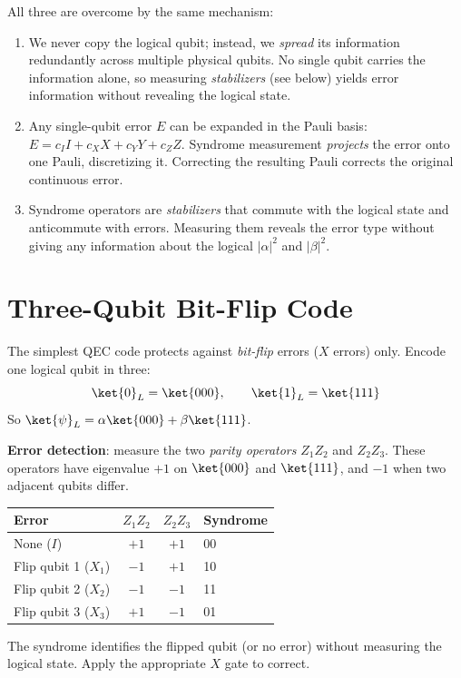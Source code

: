 \documentclass[oneside]{academica}
\begin{document}
All three are overcome by the same mechanism:
\begin{enumerate}
  \item We never copy the logical qubit; instead, we \emph{spread} its information redundantly across multiple physical qubits.
    No single qubit carries the information alone, so measuring \emph{stabilizers} (see below) yields error information without revealing the logical state.
  \item Any single-qubit error $E$ can be expanded in the Pauli basis: $E=c_I I+c_X X+c_Y Y+c_Z Z$.
    Syndrome measurement \emph{projects} the error onto one Pauli, discretizing it.
    Correcting the resulting Pauli corrects the original continuous error.
  \item Syndrome operators are \emph{stabilizers} that commute with the logical state and anticommute with errors.
    Measuring them reveals the error type without giving any information about the logical $|\alpha|^2$ and $|\beta|^2$.
\end{enumerate}

\section{Three-Qubit Bit-Flip Code}

The simplest QEC code protects against \emph{bit-flip} errors ($X$ errors) only.
Encode one logical qubit in three:
\begin{equation*}
  \ket{0}_L=\ket{000},\qquad\ket{1}_L=\ket{111}
\end{equation*}
So $\ket{\psi}_L=\alpha\ket{000}+\beta\ket{111}$.

\textbf{Error detection}: measure the two \emph{parity operators} $Z_1Z_2$ and $Z_2Z_3$.
These operators have eigenvalue $+1$ on $\ket{000}$ and $\ket{111}$, and $-1$ when two adjacent qubits differ.
\begin{center}
  \renewcommand{\arraystretch}{1.2}
  \begin{tabular}{l|c|c|l}
    \textbf{Error} & $Z_1Z_2$ & $Z_2Z_3$ & \textbf{Syndrome} \\
    \hline
    None ($I$) & $+1$ & $+1$ & 00 \\
    Flip qubit 1 ($X_1$) & $-1$ & $+1$ & 10 \\
    Flip qubit 2 ($X_2$) & $-1$ & $-1$ & 11 \\
    Flip qubit 3 ($X_3$) & $+1$ & $-1$ & 01 \\
  \end{tabular}
\end{center}
The syndrome identifies the flipped qubit (or no error) without measuring the logical state.
Apply the appropriate $X$ gate to correct.
\end{document}
